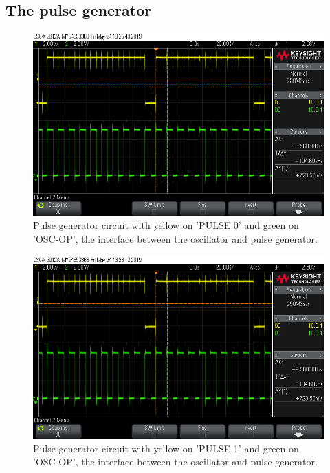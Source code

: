 \subsection{The pulse generator}


\begin{figure}[H]
\centering
\includegraphics[width=.9\textwidth]{figures/scope_4.png}
\caption{Pulse generator circuit with yellow on 'PULSE 0' and green on 'OSC-OP', the interface between the oscillator and pulse generator.}
\label{fig:scope_4}
\end{figure}


\begin{figure}[H]
\centering
\includegraphics[width=.9\textwidth]{figures/scope_5.png}
\caption{Pulse generator circuit with yellow on 'PULSE 1' and green on 'OSC-OP', the interface between the oscillator and pulse generator.}
\label{fig:scope_5}
\end{figure}


